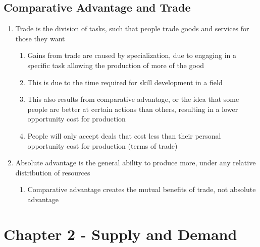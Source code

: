 \documentclass[11 pt, twoside]{article}
\begin{document}
\subsection{Comparative Advantage and Trade}
\begin{enumerate}
\item Trade is the division of tasks, such that people trade goods and services for those they want
\begin{enumerate}
\item Gains from trade are caused by specialization, due to engaging in a specific task allowing the production of more of the good
\item This is due to the time required for skill development in a field
\item This also results from comparative advantage, or the idea that some people are better at certain actions than others, resulting in a lower opportunity cost for production
\item People will only accept deals that cost less than their personal opportunity cost for production (terms of trade)
\end{enumerate}
\item Absolute advantage is the general ability to produce more, under any relative distribution of resources
\begin{enumerate}
\item Comparative advantage creates the mutual benefits of trade, not absolute advantage
\end{enumerate}
\end{enumerate}

\section{Chapter 2 - Supply and Demand}
\end{document}
